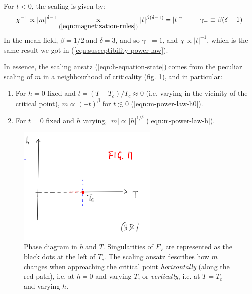 \documentclass[../../main.tex]{subfiles}
\begin{document}
\begin{enumerate}
    For $t < 0$, the scaling is given by:
    \begin{align*}
        \chi^{-1} \propto |m|^{\delta-1} \underset{(\ref{eqn:magnetization-rules})}{\propto} |t|^{\beta (\delta-1)} = |t|^{\gamma_-} \qquad \gamma_- \equiv \beta(\delta-1)
    \end{align*}
    In the mean field, $\beta = 1/2$ and $\delta=3$, and so $\gamma_- = 1$, and $\chi \propto |t|^{-1}$, which is the same result we got in (\ref{eqn:susceptibility-power-law}).

\end{enumerate}

In essence, the scaling ansatz (\ref{eqn:h-equation-state}) comes from the peculiar scaling of $m$ in a neighbourhood of criticality (fig. \ref{fig:criticality-vicinity}), and in particular: 
\begin{enumerate}[label=\alph*)]
    \item \label{item:1} For $h=0$ fixed and $t = (T-T_c)/T_c \approx 0$ (i.e. varying in the vicinity of the critical point), $m \propto (-t)^\beta$ for $t \lesssim 0$ (\ref{eqn:m-power-law-h0}).
    \item \label{item:2} For $t=0$ fixed and $h$ varying, $|m| \propto |h|^{1/\delta}$ (\ref{eqn:m-power-law-h}).
\end{enumerate} 

\begin{figure}[H]
    \centering
    \includegraphics[width=0.6\textwidth]{criticality-vicinity.png}
    \caption{Phase diagram in $h$ and $T$. Singularities of $F_V$ are represented as the black dots at the left of $T_c$. The scaling ansatz describes how $m$ changes when approaching the critical point \textit{horizontally} (along the red path), i.e. at $h=0$ and varying $T$, or \textit{vertically}, i.e. at $T = T_c$ and varying $h$.}
    \label{fig:criticality-vicinity}
\end{figure}
\end{document}
